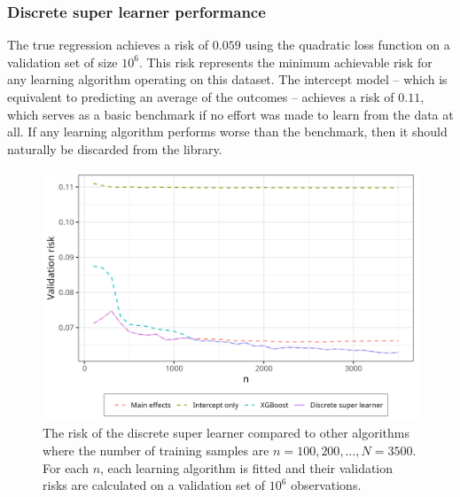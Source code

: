 \documentclass[./main.tex]{subfiles}
\begin{document}
\subsubsection{Discrete super learner performance}
The true regression achieves a risk of $ 0.059 $ using the quadratic loss function on a validation set of size $ 10^{6} $. This risk represents the minimum achievable risk for any learning algorithm operating on this dataset. The intercept model -- which is equivalent to predicting an average of the outcomes -- achieves a risk of $ 0.11 $, which serves as a basic benchmark if no effort was made to learn from the data at all. If any learning algorithm performs worse than the benchmark, then it should naturally be discarded from the library.  
\begin{figure}[H]
    \centering
    \includegraphics[width=\textwidth]{figures/dsl_loss.png}
    \caption{The risk of the discrete super learner compared to other algorithms where the number of training samples are $n = 100, 200, \dots , N = 3500 $. For each $ n $, each learning algorithm is fitted and their validation risks are calculated on a validation set of $ 10^{6} $ observations.} 
    \label{fig:loss_min_of_both}
\end{figure}
\end{document}
